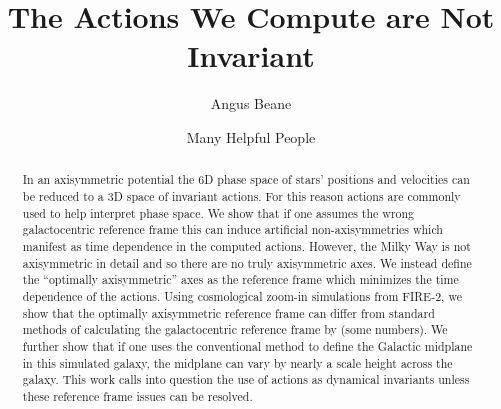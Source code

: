 \documentclass[twocolumn]{aastex62}
\begin{document}
\title{The Actions We Compute are Not Invariant}


\author{Angus Beane}

\author{Many Helpful People}
\noaffiliation

\begin{abstract}

In an axisymmetric potential the 6D phase space of stars' positions and
velocities can be reduced to a 3D space of invariant actions. For this reason
actions are commonly used to help interpret phase space. We show that if one
assumes the wrong galactocentric reference frame this can induce artificial
non-axisymmetries which manifest as time dependence in the computed actions.
However, the Milky Way is not axisymmetric in detail and so there are no
truly axisymmetric axes. We instead define the  ``optimally axisymmetric''
axes as the reference frame which minimizes the time dependence of the
actions. Using cosmological zoom-in simulations from FIRE-2, we show that the
optimally axisymmetric reference frame can differ from standard methods of
calculating the galactocentric reference frame by (some numbers). We further
show that if one uses the conventional method to define the Galactic midplane
in this simulated galaxy, the midplane can vary by nearly a scale height
across the galaxy. This work calls into question the use of actions as
dynamical invariants unless these reference frame issues can be resolved.



\end{abstract}
\end{document}
